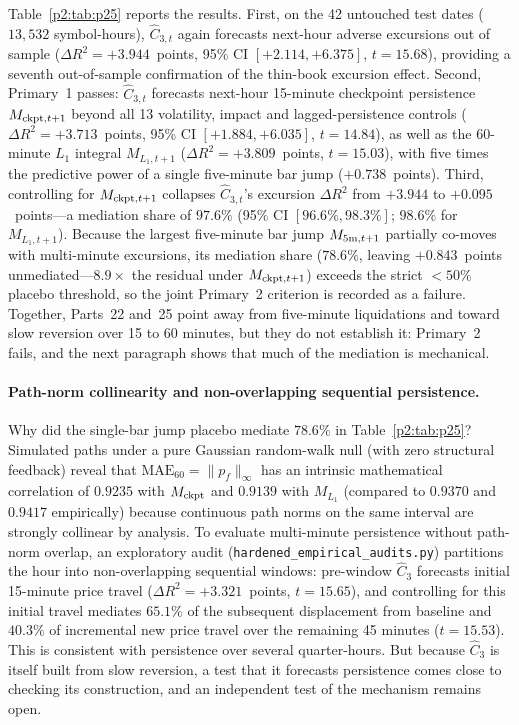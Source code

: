 Table~\ref{p2:tab:p25} reports the results. First, on the 42 untouched test dates ($13{,}532$ symbol-hours), $\hat C_{3,t}$ again forecasts next-hour adverse excursions out of sample ($\Delta R^2=+3.944$~points, 95\% CI $[+2.114,+6.375]$, $t=15.68$), providing a seventh out-of-sample confirmation of the thin-book excursion effect. Second, Primary~1 passes: $\hat C_{3,t}$ forecasts next-hour 15-minute checkpoint persistence $M_{{\rm ckpt},t+1}$ beyond all 13 volatility, impact and lagged-persistence controls ($\Delta R^2=+3.713$~points, 95\% CI $[+1.884,+6.035]$, $t=14.84$), as well as the 60-minute $L_1$ integral $M_{L_1,t+1}$ ($\Delta R^2=+3.809$~points, $t=15.03$), with five times the predictive power of a single five-minute bar jump ($+0.738$~points). Third, controlling for $M_{{\rm ckpt},t+1}$ collapses $\hat C_{3,t}$'s excursion $\Delta R^2$ from $+3.944$ to $+0.095$~points---a mediation share of $97.6\%$ (95\% CI $[96.6\%,98.3\%]$; $98.6\%$ for $M_{L_1,t+1}$). Because the largest five-minute bar jump $M_{5{\rm m},t+1}$ partially co-moves with multi-minute excursions, its mediation share ($78.6\%$, leaving $+0.843$~points unmediated---$8.9\times$ the residual under $M_{{\rm ckpt},t+1}$) exceeds the strict $<50\%$ placebo threshold, so the joint Primary~2 criterion is recorded as a failure. Together, Parts~22 and~25 point away from five-minute liquidations and toward slow reversion over 15 to 60 minutes, but they do not establish it: Primary~2 fails, and the next paragraph shows that much of the mediation is mechanical.

\paragraph{Path-norm collinearity and non-overlapping sequential persistence.} Why did the single-bar jump placebo mediate $78.6\%$ in Table~\ref{p2:tab:p25}? Simulated paths under a pure Gaussian random-walk null (with zero structural feedback) reveal that $\mathrm{MAE}_{60}=\|p_f\|_\infty$ has an intrinsic mathematical correlation of $0.9235$ with $M_{\rm ckpt}$ and $0.9139$ with $M_{L_1}$ (compared to $0.9370$ and $0.9417$ empirically) because continuous path norms on the same interval are strongly collinear by analysis. To evaluate multi-minute persistence without path-norm overlap, an exploratory audit (\texttt{hardened\_empirical\_audits.py}) partitions the hour into non-overlapping sequential windows: pre-window $\hat C_3$ forecasts initial 15-minute price travel ($\Delta R^2=+3.321$~points, $t=15.65$), and controlling for this initial travel mediates $65.1\%$ of the subsequent displacement from baseline and $40.3\%$ of incremental new price travel over the remaining 45 minutes ($t=15.53$). This is consistent with persistence over several quarter-hours. But because $\hat C_3$ is itself built from slow reversion, a test that it forecasts persistence comes close to checking its construction, and an independent test of the mechanism remains open.
